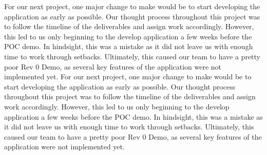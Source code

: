 \documentclass{article}
\begin{document}
\noindent For our next project, one major change to make would be to start developing the application as early as possible. Our thought process throughout this project was to follow the timeline of the deliverables and assign work accordingly. However, this led to us only beginning to the develop application a few weeks before the POC demo. In hindsight, this was a mistake as it did not leave us with enough time to work through setbacks. Ultimately, this caused our team to have a pretty poor Rev 0 Demo, as several key features of the application were not implemented yet.
\noindent For our next project, one major change to make would be to start developing the application as early as possible. Our thought process throughout this project was to follow the timeline of the deliverables and assign work accordingly. However, this led to us only beginning to the develop application a few weeks before the POC demo. In hindsight, this was a mistake as it did not leave us with enough time to work through setbacks. Ultimately, this caused our team to have a pretty poor Rev 0 Demo, as several key features of the application were not implemented yet.
\end{document}
